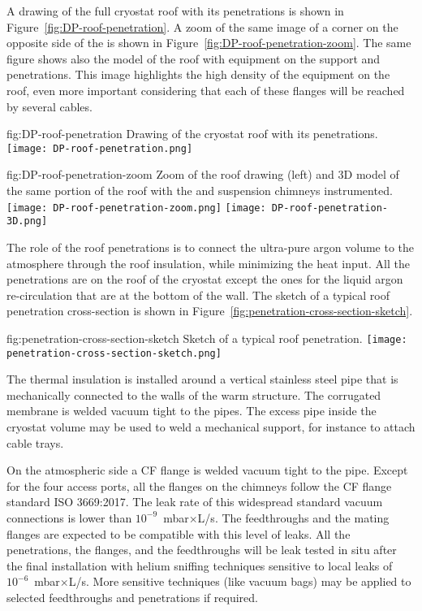 A drawing of the full cryostat roof with its penetrations is shown in Figure~\ref{fig:DP-roof-penetration}.
A zoom of the same image of a corner on the opposite side of the  is shown in Figure~\ref{fig:DP-roof-penetration-zoom}.
The same figure shows also the \threed model of the roof with equipment on the  support and  penetrations.
This image highlights the high density of the equipment on the  roof, even more important considering that each of these flanges will be reached by several cables.

\begin{dunefigure}{fig:DP-roof-penetration}
{Drawing of the cryostat roof with its penetrations.}
\texttt{[image: DP-roof-penetration.png]}
\end{dunefigure}

\begin{dunefigure}{fig:DP-roof-penetration-zoom}
{Zoom of the  roof drawing (left) and 3D model of the same portion of the roof with the  and  suspension chimneys instrumented.}
\texttt{[image: DP-roof-penetration-zoom.png]}
\texttt{[image: DP-roof-penetration-3D.png]}
\end{dunefigure}

The role of the roof penetrations is to connect the ultra-pure argon volume to the atmosphere through the roof insulation, while minimizing the heat input.
All the penetrations are on the roof of the cryostat except the ones for the liquid argon re-circulation that are at the bottom of the  wall.
The sketch of a typical roof penetration cross-section is shown in Figure~\ref{fig:penetration-cross-section-sketch}.
\begin{dunefigure}{fig:penetration-cross-section-sketch}
{Sketch of a typical roof penetration.}
\texttt{[image: penetration-cross-section-sketch.png]}
\end{dunefigure}
The thermal insulation is installed around a vertical stainless steel pipe that is mechanically connected to the walls of the warm structure.
The corrugated membrane is welded vacuum tight to the pipes.
The excess pipe inside the cryostat volume may be used to weld a mechanical support, for instance to attach cable trays.

On the atmospheric side a  CF flange is welded vacuum tight to the pipe.
Except for the four access ports, all the flanges on the chimneys follow the  CF flange standard ISO 3669:2017.
The leak rate of this widespread standard vacuum connections is lower than $10^{-9}$~mbar$\times$L/s.
The feedthroughs and the mating flanges are expected to be compatible with this level of leaks.
All the penetrations, the flanges, and the feedthroughs will be leak tested in situ after the final installation with helium sniffing techniques sensitive to local leaks of $10^{-6}$~mbar$\times$L/s.
More sensitive techniques (like vacuum bags) may be applied to selected feedthroughs and penetrations if required.

